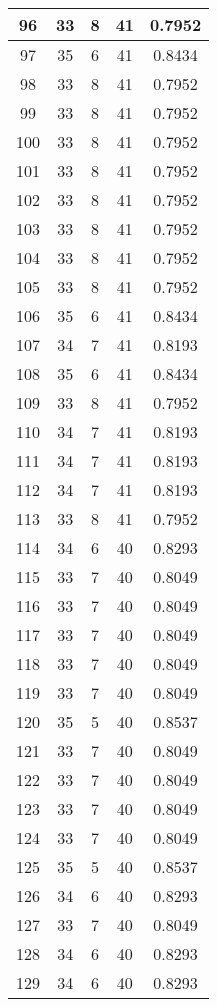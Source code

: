 \documentclass[letterpaper, 12pt]{article}
\begin{document}
\begin{longtable}{|c|c|c|c|c|}
\hline
96 & 33 & 8 & 41 & 0.7952 \\
\hline
97 & 35 & 6 & 41 & 0.8434 \\
\hline
98 & 33 & 8 & 41 & 0.7952 \\
\hline
99 & 33 & 8 & 41 & 0.7952 \\
\hline
100 & 33 & 8 & 41 & 0.7952 \\
\hline
101 & 33 & 8 & 41 & 0.7952 \\
\hline
102 & 33 & 8 & 41 & 0.7952 \\
\hline
103 & 33 & 8 & 41 & 0.7952 \\
\hline
104 & 33 & 8 & 41 & 0.7952 \\
\hline
105 & 33 & 8 & 41 & 0.7952 \\
\hline
106 & 35 & 6 & 41 & 0.8434 \\
\hline
107 & 34 & 7 & 41 & 0.8193 \\
\hline
108 & 35 & 6 & 41 & 0.8434 \\
\hline
109 & 33 & 8 & 41 & 0.7952 \\
\hline
110 & 34 & 7 & 41 & 0.8193 \\
\hline
111 & 34 & 7 & 41 & 0.8193 \\
\hline
112 & 34 & 7 & 41 & 0.8193 \\
\hline
113 & 33 & 8 & 41 & 0.7952 \\
\hline
114 & 34 & 6 & 40 & 0.8293 \\
\hline
115 & 33 & 7 & 40 & 0.8049 \\
\hline
116 & 33 & 7 & 40 & 0.8049 \\
\hline
117 & 33 & 7 & 40 & 0.8049 \\
\hline
118 & 33 & 7 & 40 & 0.8049 \\
\hline
119 & 33 & 7 & 40 & 0.8049 \\
\hline
120 & 35 & 5 & 40 & 0.8537 \\
\hline
121 & 33 & 7 & 40 & 0.8049 \\
\hline
122 & 33 & 7 & 40 & 0.8049 \\
\hline
123 & 33 & 7 & 40 & 0.8049 \\
\hline
124 & 33 & 7 & 40 & 0.8049 \\
\hline
125 & 35 & 5 & 40 & 0.8537 \\
\hline
126 & 34 & 6 & 40 & 0.8293 \\
\hline
127 & 33 & 7 & 40 & 0.8049 \\
\hline
128 & 34 & 6 & 40 & 0.8293 \\
\hline
129 & 34 & 6 & 40 & 0.8293 \\

\end{longtable}
\end{document}
